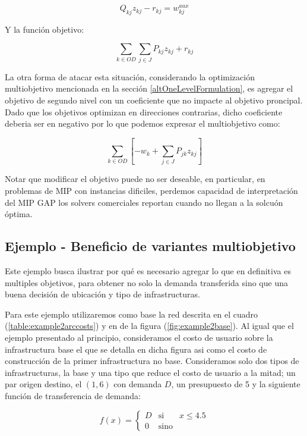 \documentclass{article}
\begin{document}
  \begin{equation}
    Q_{kj} z_{kj} - r_{kj} = w^{aux}_{kj}
  \end{equation}

  Y la función objetivo:

  \begin{equation}
    \sum_{k \in OD} \sum_{j \in J} P_{kj}z_{kj} + r_{kj}
  \end{equation}

  La otra forma de atacar esta situación, considerando la optimización multiobjetivo mencionada en la sección \ref{altOneLevelFormulation}, es agregar el objetivo de segundo nivel con un coeficiente que no impacte al objetivo proncipal. Dado que los objetivos optimizan en direcciones contrarias, dicho coeficiente deberia ser en negativo por lo que podemos expresar el multiobjetivo como:

  \begin{equation}
      \sum_{k \in OD} \left[ -w_k + \sum_{j \in J} P_{jk}z_{kj} \right]
  \end{equation}

  Notar que modificar el objetivo puede no ser deseable, en particular, en problemas de MIP con instancias dificiles, perdemos capacidad de interpretación del MIP GAP los solvers comerciales reportan cuando no llegan a la solcuón óptima.

  \subsection{Ejemplo - Beneficio de variantes multiobjetivo}

  Este ejemplo busca ilustrar por qué es necesario agregar lo que en definitiva es multiples objetivos, para obtener no solo la demanda transferida sino que una buena decisión de ubicación y tipo de infrastructuras.

  Para este ejemplo utilizaremos como base la red descrita en el cuadro (\ref{table:example2arccosts}) y en de la figura (\ref{fig:example2base}). Al igual que el ejemplo presentado al principio, consideramos el costo de usuario sobre la infrastructura base el que se detalla en dicha figura asi como el costo de construcción de la primer infrastructura no base. Consideramos solo dos tipos de infrastructuras, la base y una tipo que reduce el costo de usuario a la mitad; un par origen destino, el $(1, 6)$ con demanda $D$, un presupuesto de 5 y la siguiente función de transferencia de demanda:

  $$
    f(x) = \left\{ \begin{array}{lcr}
            D & \mbox{si}   & x \leq 4.5 \\
            0 & \mbox{sino} &
    \end{array}
    \right.
  $$
\end{document}
